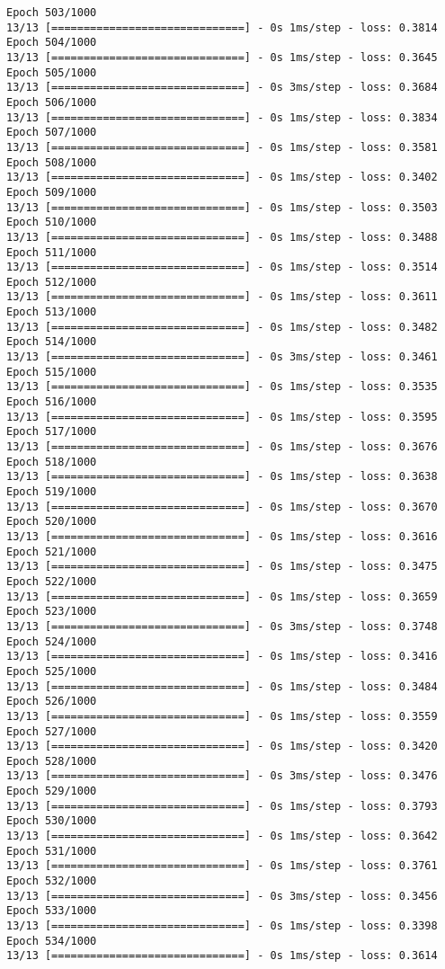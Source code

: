\documentclass[11pt]{article}
\begin{document}
\begin{Verbatim}[commandchars=\\\{\}]
Epoch 503/1000
13/13 [==============================] - 0s 1ms/step - loss: 0.3814
Epoch 504/1000
13/13 [==============================] - 0s 1ms/step - loss: 0.3645
Epoch 505/1000
13/13 [==============================] - 0s 3ms/step - loss: 0.3684
Epoch 506/1000
13/13 [==============================] - 0s 1ms/step - loss: 0.3834
Epoch 507/1000
13/13 [==============================] - 0s 1ms/step - loss: 0.3581
Epoch 508/1000
13/13 [==============================] - 0s 1ms/step - loss: 0.3402
Epoch 509/1000
13/13 [==============================] - 0s 1ms/step - loss: 0.3503
Epoch 510/1000
13/13 [==============================] - 0s 1ms/step - loss: 0.3488
Epoch 511/1000
13/13 [==============================] - 0s 1ms/step - loss: 0.3514
Epoch 512/1000
13/13 [==============================] - 0s 1ms/step - loss: 0.3611
Epoch 513/1000
13/13 [==============================] - 0s 1ms/step - loss: 0.3482
Epoch 514/1000
13/13 [==============================] - 0s 3ms/step - loss: 0.3461
Epoch 515/1000
13/13 [==============================] - 0s 1ms/step - loss: 0.3535
Epoch 516/1000
13/13 [==============================] - 0s 1ms/step - loss: 0.3595
Epoch 517/1000
13/13 [==============================] - 0s 1ms/step - loss: 0.3676
Epoch 518/1000
13/13 [==============================] - 0s 1ms/step - loss: 0.3638
Epoch 519/1000
13/13 [==============================] - 0s 1ms/step - loss: 0.3670
Epoch 520/1000
13/13 [==============================] - 0s 1ms/step - loss: 0.3616
Epoch 521/1000
13/13 [==============================] - 0s 1ms/step - loss: 0.3475
Epoch 522/1000
13/13 [==============================] - 0s 1ms/step - loss: 0.3659
Epoch 523/1000
13/13 [==============================] - 0s 3ms/step - loss: 0.3748
Epoch 524/1000
13/13 [==============================] - 0s 1ms/step - loss: 0.3416
Epoch 525/1000
13/13 [==============================] - 0s 1ms/step - loss: 0.3484
Epoch 526/1000
13/13 [==============================] - 0s 1ms/step - loss: 0.3559
Epoch 527/1000
13/13 [==============================] - 0s 1ms/step - loss: 0.3420
Epoch 528/1000
13/13 [==============================] - 0s 3ms/step - loss: 0.3476
Epoch 529/1000
13/13 [==============================] - 0s 1ms/step - loss: 0.3793
Epoch 530/1000
13/13 [==============================] - 0s 1ms/step - loss: 0.3642
Epoch 531/1000
13/13 [==============================] - 0s 1ms/step - loss: 0.3761
Epoch 532/1000
13/13 [==============================] - 0s 3ms/step - loss: 0.3456
Epoch 533/1000
13/13 [==============================] - 0s 1ms/step - loss: 0.3398
Epoch 534/1000
13/13 [==============================] - 0s 1ms/step - loss: 0.3614

\end{Verbatim}
\end{document}
